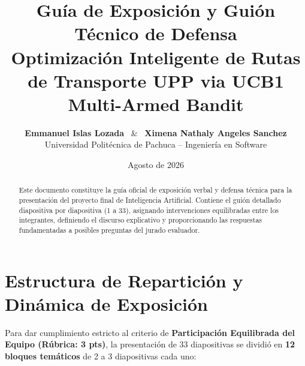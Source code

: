 \documentclass[11pt, a4paper]{article}
\title{\textbf{\LARGE Guía de Exposición y Guión Técnico de Defensa}\\[6pt]
\Large Optimización Inteligente de Rutas de Transporte UPP via UCB1 Multi-Armed Bandit}
\author{\textbf{Emmanuel Islas Lozada} \ \& \ \textbf{Ximena Nathaly Angeles Sanchez}\\[4pt]
Universidad Politécnica de Pachuca -- Ingeniería en Software}
\date{Agosto de 2026}
\begin{document}
\maketitle

\begin{abstract}
\noindent Este documento constituye la guía oficial de exposición verbal y defensa técnica para la presentación del proyecto final de Inteligencia Artificial. Contiene el guión detallado diapositiva por diapositiva (1 a 33), asignando intervenciones equilibradas entre los integrantes, definiendo el discurso explicativo y proporcionando las respuestas fundamentadas a posibles preguntas del jurado evaluador.
\end{abstract}

\tableofcontents
\newpage

\section{Estructura de Repartición y Dinámica de Exposición}

Para dar cumplimiento estricto al criterio de \textbf{Participación Equilibrada del Equipo (Rúbrica: 3 pts)}, la presentación de 33 diapositivas se dividió en \textbf{12 bloques temáticos} de 2 a 3 diapositivas cada uno:
\end{document}
